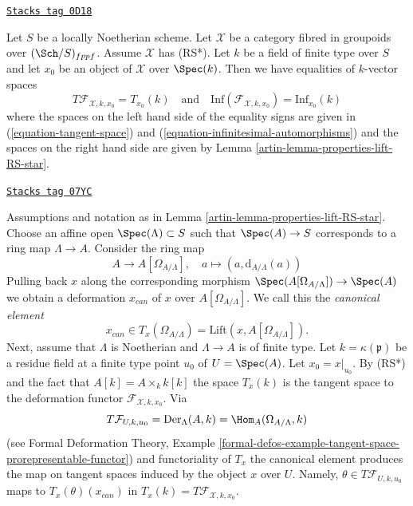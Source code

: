 \begin{remark}

\label{artin-remark-compare-deformation-spaces}
\href{https://stacks.math.columbia.edu/tag/0D18}{\texttt{Stacks tag 0D18}}

Let $S$ be a locally Noetherian scheme. Let $\mathcal{X}$ be a category fibred
in groupoids over $(\Sch/S)_{fppf}$. Assume $\mathcal{X}$ has (RS*).
Let $k$ be a field of finite type over $S$ and let $x_0$ be an object of
$\mathcal{X}$ over $\Spec(k)$. Then we have equalities of
$k$-vector spaces
$$
T\mathcal{F}_{\mathcal{X}, k, x_0} = T_{x_0}(k)
\quad\text{and}\quad
\text{Inf}(\mathcal{F}_{\mathcal{X}, k, x_0}) =
\text{Inf}_{x_0}(k)
$$
where the spaces on the left hand side of the equality signs are
given in (\ref{equation-tangent-space}) and
(\ref{equation-infinitesimal-automorphisms})
and the spaces on the right hand side are given by
Lemma \ref{artin-lemma-properties-lift-RS-star}.
\end{remark}

\begin{remark}

\label{artin-remark-canonical-element}
\href{https://stacks.math.columbia.edu/tag/07YC}{\texttt{Stacks tag 07YC}}

Assumptions and notation as in Lemma \ref{artin-lemma-properties-lift-RS-star}.
Choose an affine open $\Spec(\Lambda) \subset S$ such that $\Spec(A) \to S$
corresponds to a ring map $\Lambda \to A$. Consider the ring map
$$
A \longrightarrow A[\Omega_{A/\Lambda}],
\quad
a \longmapsto (a, \text{d}_{A/\Lambda}(a))
$$
Pulling back $x$ along the corresponding morphism
$\Spec(A[\Omega_{A/\Lambda}]) \to \Spec(A)$ we obtain a
deformation $x_{can}$ of $x$ over $A[\Omega_{A/\Lambda}]$. We call this
the {\it canonical element}
$$
x_{can} \in T_x(\Omega_{A/\Lambda}) = \text{Lift}(x, A[\Omega_{A/\Lambda}]).
$$
Next, assume that $\Lambda$ is Noetherian and $\Lambda \to A$
is of finite type. Let
$k = \kappa(\mathfrak p)$ be a residue field at a finite type point $u_0$
of $U = \Spec(A)$. Let $x_0 = x|_{u_0}$. By (RS*) and the fact that
$A[k] = A \times_k k[k]$ the space $T_x(k)$ is the tangent space to the
deformation functor $\mathcal{F}_{\mathcal{X}, k, x_0}$. Via
$$
T\mathcal{F}_{U, k, u_0} =
\text{Der}_\Lambda(A, k) = \Hom_A(\Omega_{A/\Lambda}, k)
$$
(see Formal Deformation Theory, Example
\ref{formal-defos-example-tangent-space-prorepresentable-functor})
and functoriality of $T_x$ the canonical element produces the map
on tangent spaces induced by the object $x$ over $U$. Namely,
$\theta \in T\mathcal{F}_{U, k, u_0}$ maps to $T_x(\theta)(x_{can})$
in $T_x(k) = T\mathcal{F}_{\mathcal{X}, k, x_0}$.
\end{remark}

